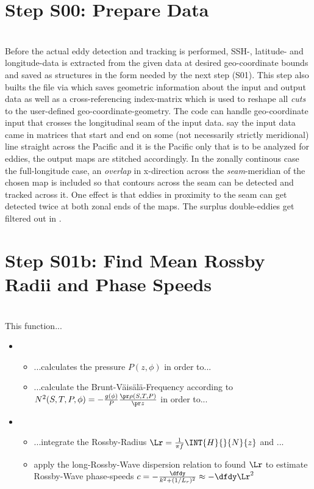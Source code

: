 \section{Step S00: Prepare Data}
	\\
Before the actual eddy detection and tracking is performed,  SSH-, latitude- and longitude-data is extracted from the given data at desired geo-coordinate bounds and saved as structures in the form needed by the next step (S01). This step also builts the file  via  which saves geometric information about the input and output data as well as a cross-referencing index-matrix which is used to reshape all \textit{cuts} to the user-defined geo-coordinate-geometry. The code can handle geo-coordinate input that crosses the longitudinal seam of
the input data. \Eg say the input data came in matrices that start and end on
some (not necessarily strictly meridional) line straight across the Pacific and
it is the Pacific only that is to be analyzed for eddies, the output maps are
stitched accordingly. In the zonally continous case \ie the full-longitude case, an \textit{overlap} in x-direction across the \textit{seam}-meridian of the chosen map is included so that contours across the seam can be detected and tracked across it. One effect is that eddies in proximity to the seam can get detected twice at both zonal ends of the maps. The surplus double-eddies get filtered out in .
\section{Step S01b: Find Mean Rossby Radii and Phase Speeds}
\\

This function...
\begin{itemize}
	\item
	\begin{itemize}
		\item
		...calculates the pressure $P(z,\phi)$ in order to...
		\item
		...calculate the Brunt-V\"ais\"al\"a-Frequency according to $N^{2}(S,T,P,\phi)=-\frac{g(\phi)}{P} \frac{\pr \rho(S,T,P)}{\pr z}$
		in order to...
	\end{itemize}
	\item
	\begin{itemize}
		\item
		...integrate the Rossby-Radius $\Lr=\frac{1}{\pi f}\INT{H}{ }{N}{z}$ and ...
		\item
		apply the long-Rossby-Wave dispersion relation to found $\Lr$ to estimate Rossby-Wave phase-speeds $c=-\frac{\dfdy}{k^2+(1/L_r)^2} \approx -\dfdy \Lr^2$
	\end{itemize}
\end{itemize}

